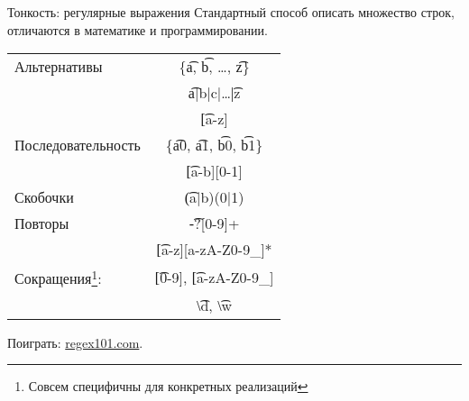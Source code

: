 \begin{frame}[t,fragile]{Тонкость: регулярные выражения}
	Стандартный способ описать множество строк, отличаются в математике и программировании.

	\begin{center}
	\begin{tabular}{|l|c|}
	\hline
	Альтернативы
		& \{\t{a}, \t{b}, \dots, \t{z}\} \\
		& \t{a|b|c|}\dots\t{|z} \\
		& \t{[a-z]} \\\hline
	Последовательность
		& \{\t{a0}, \t{a1}, \t{b0}, \t{b1}\} \\
		& \t{[a-b][0-1]} \\\hline
	Скобочки
		&\t{(a|b)(0|1)} \\\hline
	Повторы 
		& \t{-?[0-9]+} \\
		& \t{[a-z][a-zA-Z0-9\_]*} \\\hline
	Сокращения\footnote{Совсем специфичны для конкретных реализаций}:
		& \t{[0-9]}, \t{[a-zA-Z0-9\_]} \\
		& \t{\textbackslash{}d}, \t{\textbackslash{}w} \\\hline
	\end{tabular}
	\end{center}

	Поиграть: \href{https://regex101.com}{regex101.com}.
\end{frame}
